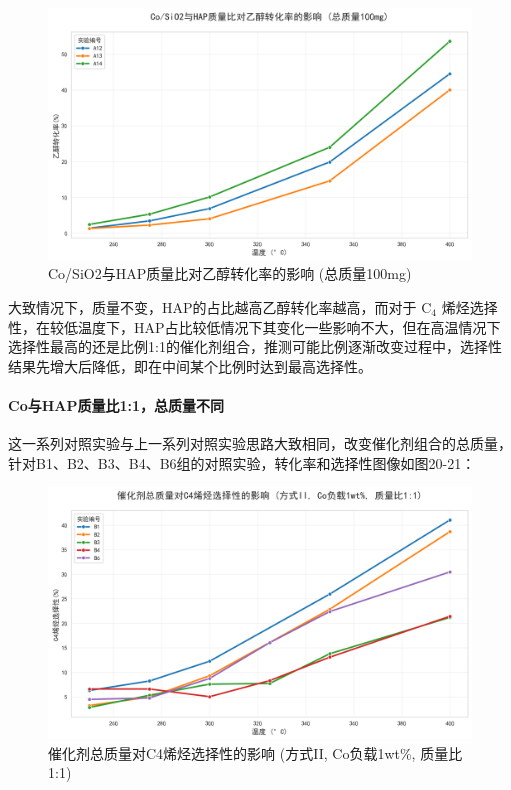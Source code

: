 \begin{figure}[h]%
	\centering%
	\includegraphics [scale=0.6]{图/2-5-1-2.png}
	\caption{Co/SiO2与HAP质量比对乙醇转化率的影响 (总质量100mg)} 
	\label{fig:1}
\end{figure}

大致情况下，质量不变，HAP的占比越高乙醇转化率越高，而对于 \( \text{C}_4 \) 烯烃选择性，在较低温度下，HAP占比较低情况下其变化一些影响不大，但在高温情况下选择性最高的还是比例1:1的催化剂组合，推测可能比例逐渐改变过程中，选择性结果先增大后降低，即在中间某个比例时达到最高选择性。


\paragraph{Co与HAP质量比1:1，总质量不同}
这一系列对照实验与上一系列对照实验思路大致相同，改变催化剂组合的总质量，针对B1、B2、B3、B4、B6组的对照实验，转化率和选择性图像如图20-21：

\begin{figure}[h]%
	\centering%
	\includegraphics [scale=0.6]{图/2-6-1-1.png}
	\caption{催化剂总质量对C4烯烃选择性的影响 (方式II, Co负载1wt\%, 质量比1:1)} 
	\label{fig:1}
\end{figure}

